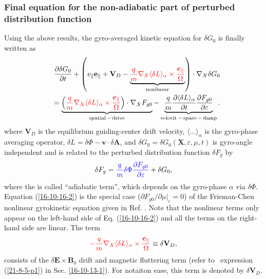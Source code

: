 \documentclass{article}
\newcommand{\nobracket}{}
\newcommand{\tmcolor}[2]{{\color{#1}{#2}}}
\newcommand{\tmmathbf}[1]{\ensuremath{\boldsymbol{#1}}}
\newcommand{\tmop}[1]{\ensuremath{\operatorname{#1}}}
\begin{document}
\subsubsection{Final equation for the non-adiabatic part of perturbed
distribution function}

Using the above results, the gyro-averaged kinetic equation for $\delta G_0$
is finally written as
\begin{eqnarray}
  &  & \frac{\partial \delta G_0}{\partial t} + \left( v_{\parallel}
  \mathbf{e}_{\parallel} +\mathbf{V}_D - \underbrace{\tmcolor{red}{\frac{q}{m}
  \nabla_X \langle \delta L \rangle_{\alpha} \times
  \frac{\tmmathbf{e}_{\parallel}}{\Omega}}}_{\tmop{nonlinear}} \right) \cdot
  \nabla_X \delta G_0 \nonumber\\
  &  & = \underbrace{\left( \tmcolor{red}{\frac{q}{m} \nabla_X \langle \delta
  L \rangle_{\alpha} \times \frac{\tmmathbf{e}_{\parallel}}{\Omega}} \right)
  \cdot \nabla_X F_{g 0}}_{\tmop{spatial} - \tmop{drive}} -
  \underbrace{\frac{q}{m}  \frac{\partial \langle \delta L
  \rangle_{\alpha}}{\partial t}  \frac{\partial F_{g 0}}{\partial
  \varepsilon}}_{\tmop{velocit} - \tmop{space} - \tmop{damp}} . 
  \label{16-10-16-2}
\end{eqnarray}
where $\mathbf{V}_D$ is the equilibrium guiding-center drift velocity,
$\langle \ldots \rangle_{\alpha}$ is the gyro-phase averaging operator,
$\delta L = \delta \Phi -\mathbf{v} \cdot \delta \mathbf{A}$, and $\delta G_0
= \delta G_0 (\mathbf{X}, \varepsilon, \mu, t)$ is gyro-angle independent and
is related to the perturbed distribution function $\delta F_g$ by
\begin{equation}
  \delta F_g = \tmcolor{blue}{\frac{q}{m} \delta \Phi \frac{\partial F_{g
  0}}{\partial \varepsilon}} + \delta G_0,
\end{equation}
where the \tmcolor{blue}{first term} is called ``adiabatic term'', which
depends on the gyro-phase $\alpha$ via $\delta \Phi$. Equation
(\ref{16-10-16-2}) is the special case ($\partial F_{g 0} / \partial \mu
|_{\varepsilon} \nobracket = 0$) of the Frieman-Chen nonlinear gyrokinetic
equation given in Ref. {\cite{frieman1982}}. Note that the nonlinear terms
only appear on the left-hand side of Eq. (\ref{16-10-16-2}) and all the terms
on the right-hand side are linear. The term
\begin{equation}
  \label{19-1-3-1} \tmcolor{red}{- \frac{q}{m} \nabla_X \langle \delta L
  \rangle_{\alpha} \times \frac{\tmmathbf{e}_{\parallel}}{\Omega}} \equiv
  \delta \mathbf{V}_D,
\end{equation}
consists of the $\delta \mathbf{E} \times \mathbf{B}_0$ drift and magnetic
fluttering term (refer to \ expression (\ref{21-8-5-p1}) in Sec.
\ref{16-10-13-1}). For notaiton ease, this term is denoted by $\delta
\mathbf{V}_D$.
\end{document}
